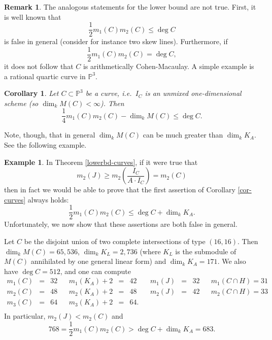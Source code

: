 \documentclass[12pt,twoside]{amsart}
\numberwithin{equation}{section}
\newtheorem{corollary}[theorem]{Corollary}
\theoremstyle{definition}
\newtheorem{remark}[theorem]{Remark}
\newtheorem{example}[theorem]{Example}
\begin{document}
\begin{remark}
The analogous statements for the lower bound are not true.  First, it is well known that
\[
\frac{1}{2} m_1(C) m_2(C) \leq \deg C
\]
is false in general (consider for instance two skew lines).  Furthermore, if
\[
\frac{1}{2} m_1(C) m_2(C) = \deg C,
\]
it does not follow that $C$ is arithmetically Cohen-Macaulay.  A simple example is a
rational quartic curve in ${\mathbb P}^3$.
\end{remark}

\begin{corollary}
Let $C \subset {\mathbb P}^3$ be a curve, i.e.\ $I_C$ is an unmixed
one-dimensional scheme (so $\dim_k M(C) < \infty$).  Then
\[
\frac{1}{4} m_1(C) m_2(C) - \dim_k M(C) \leq \deg C.
\]
\end{corollary}

Note, though, that in general $\dim_k M(C)$ can be much greater than $\dim_k K_A$. See
the following example.

\begin{example}
In Theorem \ref{lowerbd-curves}, if it were true that
\[
m_2( J) \geq m_2 \left (
\frac{I_C}{A \cdot I_C} \right ) = m_2(C)
\]
then in fact we would be able to prove that the first assertion of Corollary
\ref{cor-curves} always holds:
\[
\frac{1}{2} m_1(C) m_2(C) \leq \deg C + \dim_k K_A.
\]
Unfortunately, we now show that these assertions are both false in general.

Let $C$ be the disjoint union of two complete intersections of type $(16, 16)$.  Then
$\dim_k M(C) = 65,536$, $\dim_k K_L = 2,736$ (where $K_L$ is the submodule of $M(C)$
annihilated by one general linear form) and $\dim_k K_A = 171$.  We also have $\deg C =
512$, and one can compute
\[
\begin{array}{rclcrclcrclcrcl}
m_1(C) & = & 32 && m_1(K_A) +2 & = & 42 && m_1(J) & = & 32 && m_1(C \cap H) =
31  \\
m_2(C) & = & 48 & & m_2(K_A) +2 & = & 48 && m_2(J) & = & 42 && m_2(C \cap H) =
33 \\
m_3(C) & = & 64 & & m_3(K_A) +2 & = & 64. \\
\end{array}
\]
In particular, $m_2(J) < m_2(C)$ and
\[
768 = \frac{1}{2} m_1(C) m_2(C) > \deg C + \dim_k K_A = 683.
\]
\end{example}
\end{document}
